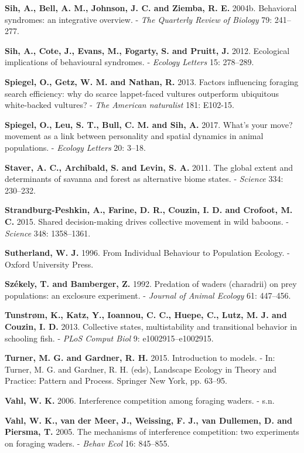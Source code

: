 \documentclass[]{scrartcl}
\begin{document}
\begin{multicols}{2}
\textbf{Sih, A., Bell, A. M., Johnson, J. C. and Ziemba, R. E.} 2004b.
Behavioral syndromes: an integrative overview. - \emph{The Quarterly
Review of Biology} 79: 241--277.

\textbf{Sih, A., Cote, J., Evans, M., Fogarty, S. and Pruitt, J.} 2012.
Ecological implications of behavioural syndromes. - \emph{Ecology
Letters} 15: 278--289.

\textbf{Spiegel, O., Getz, W. M. and Nathan, R.} 2013. Factors
influencing foraging search efficiency: why do scarce lappet-faced
vultures outperform ubiquitous white-backed vultures? - \emph{The
American naturalist} 181: E102-15.

\textbf{Spiegel, O., Leu, S. T., Bull, C. M. and Sih, A.} 2017. What's
your move? movement as a link between personality and spatial dynamics
in animal populations. - \emph{Ecology Letters} 20: 3--18.

\textbf{Staver, A. C., Archibald, S. and Levin, S. A.} 2011. The global
extent and determinants of savanna and forest as alternative biome
states. - \emph{Science} 334: 230--232.

\textbf{Strandburg-Peshkin, A., Farine, D. R., Couzin, I. D. and
Crofoot, M. C.} 2015. Shared decision-making drives collective movement
in wild baboons. - \emph{Science} 348: 1358--1361.

\textbf{Sutherland, W. J.} 1996. From Individual Behaviour to Population
Ecology. - Oxford University Press.

\textbf{Székely, T. and Bamberger, Z.} 1992. Predation of waders
(charadrii) on prey populations: an exclosure experiment. -
\emph{Journal of Animal Ecology} 61: 447--456.

\textbf{Tunstrøm, K., Katz, Y., Ioannou, C. C., Huepe, C., Lutz, M. J.
and Couzin, I. D.} 2013. Collective states, multistability and
transitional behavior in schooling fish. - \emph{PLoS Comput Biol} 9:
e1002915--e1002915.

\textbf{Turner, M. G. and Gardner, R. H.} 2015. Introduction to models.
- In: Turner, M. G. and Gardner, R. H. (eds), Landscape Ecology in
Theory and Practice: Pattern and Process. Springer New York, pp. 63--95.

\textbf{Vahl, W. K.} 2006. Interference competition among foraging
waders. - s.n.

\textbf{Vahl, W. K., van der Meer, J., Weissing, F. J., van Dullemen, D.
and Piersma, T.} 2005. The mechanisms of interference competition: two
experiments on foraging waders. - \emph{Behav Ecol} 16: 845--855.


\end{multicols}
\end{document}
